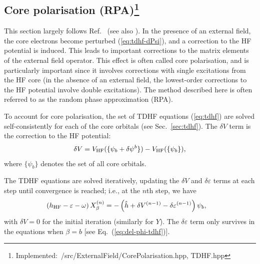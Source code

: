 \documentclass[10pt,twocolumn,a4paper]{article}%
\newcommand{\be}{\begin{equation}}
\newcommand{\ee}{\end{equation}}
\def\en{\ensuremath{\varepsilon}}
\renewcommand{\b}{\ensuremath{\beta}}
\newcommand{\w}{\ensuremath{\omega}}
\begin{document}




\subsection[Core polarisation (RPA)]{Core polarisation (RPA)\footnote{Implemented:~/src/ExternalField/CorePolarisation.hpp, TDHF.hpp}\label{sec:RPA}}

This section largely follows Ref.~\cite{DzubaHFS1984} (see also \cite{Dzuba2018a,Manakov1986,Johnson1980,Johnson1989}).
In the presence of an external field, the core electrons become perturbed (\ref{eq:tdhf-dPsi}), and a correction to the HF potential is induced.
This leads to important corrections to the matrix elements of the external field operator.
This effect is often called core polarisation, and is particularly important since it involves corrections with single excitations from the HF core (in the absence of an external field, the lowest-order corrections to the HF potential involve double excitations).
The method described here is often referred to as the random phase approximation (RPA).


To account for core polarisation, the set of TDHF equations (\ref{eq:tdhf}) are solved self-consistently for each of the core orbitals (see Sec.~\ref{sec:tdhf}).
%
The $\delta V$ term is the correction to the HF potential: 
\be\label{eq:delV-simple}
\delta V = V_{\rm HF}(\{\psi_b + \delta\psi^b\}) - V_{\rm HF}(\{\psi_b\}),
\ee
where $\{\psi_b\}$ denotes the set of all core orbitals.

The TDHF equations are solved iteratively, updating the $\delta V$ and $\delta \en$  terms at each step
until convergence is reached; i.e., at the $n$th step, we have
\begin{equation}\begin{split}
\label{eq:tdhf-rpa}
\left( h_{\rm HF} - \en -\w \right)X_\beta^{(n)} &= -\left(\hat h + \delta V^{(n-1)} - \delta \en^{(n-1)} \right)\psi_b,
\end{split}\end{equation}
with $\delta V=0$ for the initial iteration (similarly for $Y$).
The $\delta\en$ term only survives in the equations when $\b=b$ [see Eq.~(\ref{eq:del-phi-tdhf})].
\end{document}
